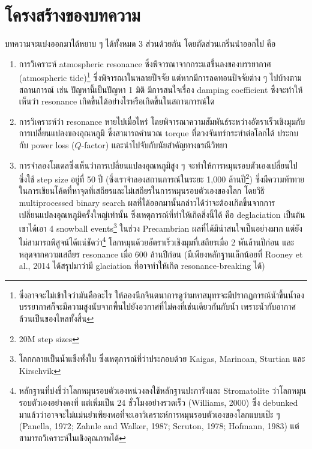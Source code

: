 \documentclass[a4paper, 12pt]{article}
\theoremstyle{plain} %
\begin{document}
\section{โครงสร้างของบทความ}
บทความจะแบ่งออกมาได้หยาบ ๆ ได้ทั้งหมด 3 ส่วนด้วยกัน โดยตัดส่วนเกริ่นนำออกไป คือ
\begin{enumerate}
	\item การวิเคราะห์ atmospheric resonance ซึ่งพิจารณาจากกระแสขึ้นลงของบรรยากาศ (atmospheric tide)\footnote{ซึ่งอาจจะไม่เข้าใจว่ามันคืออะไร ให้ลองนึกจินตนาการดูว่ามหาสมุทรจะมีปรากฏการณ์น้ำขึ้นน้ำลง บรรยากาศก็จะมีความสูงนับจากพื้นไปยังอวกาศที่ไม่คงที่เช่นเดียวกันกับน้ำ เพราะน้ำกับอากาศล้วนเป็นของไหลทั้งสิ้น} ซึ่งพิจารณาในหลายปัจจัย แต่หากมีการลดทอนปัจจัยต่าง ๆ ไปบ้างตามสถานการณ์ เช่น ปัญหานี้เป็นปัญหา 1 มิติ มีการสนใจเรื่อง damping coefficient ซึ่งจะทำให้เห็นว่า resonance เกิดขึ้นได้อย่างไรหรือเกิดขึ้นในสถานการณ์ใด
	\item การวิเคราะห์ว่า resonance หายไปเมื่อไหร่ โดยพิจารณาความสัมพันธ์ระหว่างอัตราเร็วเชิงมุมกับการเปลี่ยนแปลงของอุณหภูมิ ซึ่งสามารถคำนวณ torque ที่ดวงจันทร์กระทำต่อโลกได้ ประกบกับ power loss ($Q$-factor) และนำไปจับกับนัยสำคัญทางธรณีวิทยา
	\item การจำลองโมเดลซึ่งเห็นว่าการเปลี่ยนแปลงอุณหภูมิสูง ๆ จะทำให้การหมุนรอบตัวเองเปลี่ยนไป ซึ่งใช้ step size อยู่ที่ 50 ปี (ซึ่งเราจำลองสถานการณ์ในระยะ 1,000 ล้านปี\footnote{20M step sizes}) ซึ่งมีความท้าทายในการเขียนโค้ดที่หาจุดที่เสถียรและไม่เสถียรในการหมุนรอบตัวเองของโลก โดยวิธี multiprocessed binary search ผลที่ได้ออกมานั้นกล่าวได้ว่าจะต้องเกิดขึ้นจากการเปลี่ยนแปลงอุณหภูมิครั้งใหญ่เท่านั้น ซึ่งเหตุการณ์ที่ทำให้เกิดสิ่งนี้ได้ คือ deglaciation เป็นต้น เขาได้เอา 4 snowball events\footnote{โลกกลายเป็นน้ำแข็งทั้งใบ ซึ่งเหตุการณ์ที่ว่าประกอบด้วย Kaigas, Marinoan, Sturtian และ Kirschvik} ในช่วง Precambrian ผลที่ได้มีน่าสนใจเป็นอย่างมาก แต่ยังไม่สามารถพิสูจน์ได้แน่ชัดว่า\footnote{หลักฐานที่บ่งชี้ว่าโลกหมุนรอบตัวเองหน่วงลงใช้หลักฐานปะการังและ Stromatolite ว่าโลกหมุนรอบตัวเองอย่างคงที่ แต่เพิ่มเป็น 24 ชั่วโมงอย่างรวดเร็ว (Williams, 2000) ซึ่ง debunked มาแล้วว่าอาจจะไม่แม่นยำเพียงพอที่จะเอาวิเคราะห์การหมุนรอบตัวเองของโลกแบบเป๊ะ ๆ (Panella, 1972; Zahnle and Walker, 1987; Scruton, 1978; Hofmann, 1983) แต่สามารถวิเคราะห์ในเชิงคุณภาพได้} โลกหมุนด้วยอัตราเร็วเชิงมุมที่เสถียรเมื่อ 2 พันล้านปีก่อน และหลุดจากความเสถียร resonance เมื่อ 600 ล้านปีก่อน (มีเพียงหลักฐานเล็กน้อยที่ Rooney et al., 2014 ได้สรุปมาว่ามี glaciation ที่อาจทำให้เกิด resonance-breaking ได้)
\end{enumerate}
\end{document}
